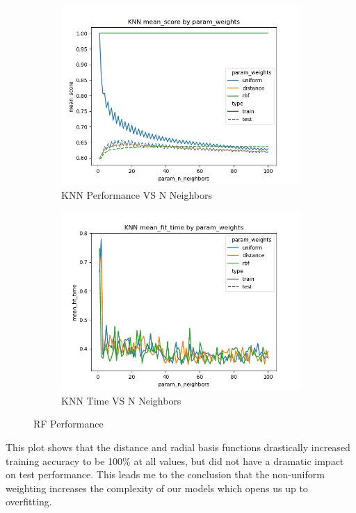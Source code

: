 \documentclass[12pt]{article}
\begin{document}
\begin{figure}
  \begin{subfigure}{.5\textwidth}
    \includegraphics[width=.95\textwidth]{../results/knn/param_weights_mean_score_param_n_neighbors.png}
    \caption{KNN Performance VS N Neighbors}
    \end{subfigure}%
  \begin{subfigure}{.5\textwidth}
    \includegraphics[width=.95\textwidth]{../results/knn/param_weights_mean_fit_time_param_n_neighbors.png}
    \caption{KNN Time VS N Neighbors}
  \end{subfigure}
  \caption{RF Performance}
  \label{figure2}
\end{figure}


This plot shows that the distance and radial basis functions drastically increased training accuracy to be 100\% at all 
values, but did not have a dramatic impact on test performance. This leads me to the conclusion that the non-uniform 
weighting increases the complexity of our models which opens us up to overfitting.
\end{document}
